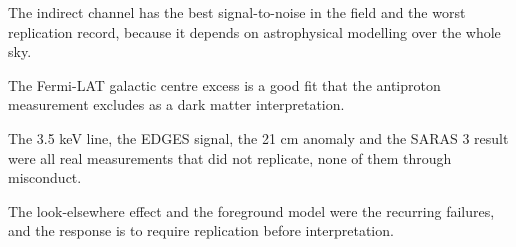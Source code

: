 \begin{keytakeaways}
\item The indirect channel has the best signal-to-noise in the field and the
worst replication record, because it depends on astrophysical modelling over
the whole sky.
\item The Fermi-LAT galactic centre excess is a good fit that the
antiproton measurement excludes as a dark matter interpretation.
\item The 3.5 keV line, the EDGES signal, the 21 cm anomaly and the SARAS 3
result were all real measurements that did not replicate, none of them
through misconduct.
\item The look-elsewhere effect and the foreground model were the recurring
failures, and the response is to require replication before interpretation.
\end{keytakeaways}
